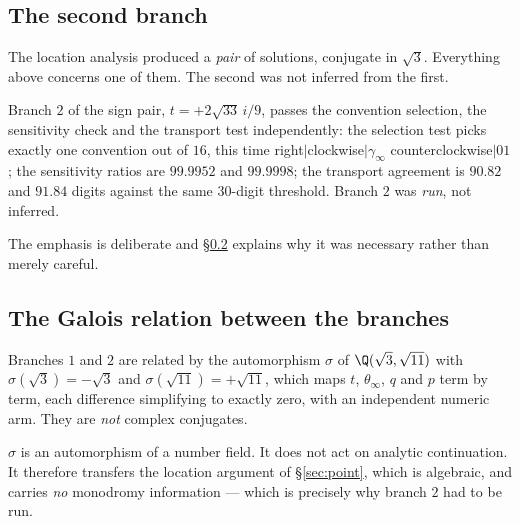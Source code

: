\subsection{The second branch}\label{ssec:branch2}

The location analysis produced a \emph{pair} of solutions, conjugate in
$\sqrt3$. Everything above concerns one of them. The second was not inferred
from the first.

\begin{remark}
Branch $2$ of the sign pair, $t=+2\sqrt{33}\,i/9$, passes the convention
selection, the sensitivity check and the transport test independently: the
selection test picks exactly one convention out of $16$, this time
right${}|{}$clockwise${}|{}\gamma_\infty$ counterclockwise${}|{}01$; the
sensitivity ratios are $99.9952$ and $99.9998$; the transport agreement is
$90.82$ and $91.84$ digits against the same $30$-digit threshold. Branch $2$
was \emph{run}, not inferred.
\end{remark}

The emphasis is deliberate and \S\ref{ssec:galois} explains why it was
necessary rather than merely careful.

\subsection{The Galois relation between the branches}\label{ssec:galois}

\begin{remark}
Branches $1$ and $2$ are related by the automorphism $\sigma$ of
$\Q(\sqrt3,\sqrt{11})$ with $\sigma(\sqrt3)=-\sqrt3$ and
$\sigma(\sqrt{11})=+\sqrt{11}$, which maps $t$, $\theta_\infty$, $q$ and $p$
term by term, each difference simplifying to exactly zero, with an independent
numeric arm. They are \emph{not} complex conjugates.
\end{remark}

\begin{remark}
$\sigma$ is an automorphism of a number field. It does not act on analytic
continuation. It therefore transfers the location argument of
\S\ref{sec:point}, which is algebraic, and carries \emph{no} monodromy
information --- which is precisely why branch $2$ had to be run.
\end{remark}

